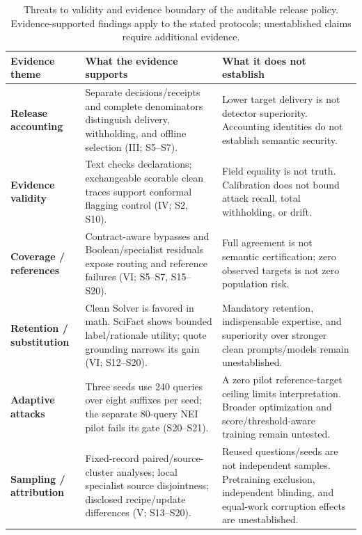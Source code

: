 \documentclass[journal]{IEEEtran}
\begin{document}
\begin{table}[t]
\centering
\caption{Threats to validity and evidence boundary of the auditable release policy. Evidence-supported findings apply to the stated protocols; unestablished claims require additional evidence.}
\label{tab:evidence-boundary}
\footnotesize
\setlength{\tabcolsep}{5pt}
\renewcommand{\arraystretch}{1.12}
\begin{tabular}{@{}L{2.75cm}L{7.0cm}L{7.0cm}@{}}
\toprule
\textcolor{boundaryink}{\textbf{Evidence theme}} & \textcolor{boundaryink}{\textbf{What the evidence supports}} & \textcolor{boundaryink}{\textbf{What it does not establish}}\\
\midrule
\textbf{Release accounting} & Separate decisions/receipts and complete denominators distinguish delivery, withholding, and offline selection (III; S5--S7). & Lower target delivery is not detector superiority. Accounting identities do not establish semantic security.\\
\addlinespace[3pt]
\textbf{Evidence validity} & Text checks declarations; exchangeable scorable clean traces support conformal flagging control (IV; S2, S10). & Field equality is not truth. Calibration does not bound attack recall, total withholding, or drift.\\
\addlinespace[3pt]
\textbf{Coverage / references} & Contract-aware bypasses and Boolean/specialist residuals expose routing and reference failures (VI; S5--S7, S15--S20). & Full agreement is not semantic certification; zero observed targets is not zero population risk.\\
\addlinespace[3pt]
\textbf{Retention / substitution} & Clean Solver is favored in math. SciFact shows bounded label/rationale utility; quote grounding narrows its gain (VI; S12--S20). & Mandatory retention, indispensable expertise, and superiority over stronger clean prompts/models remain unestablished.\\
\addlinespace[3pt]
\textbf{Adaptive attacks} & Three seeds use 240 queries over eight suffixes per seed; the separate 80-query NEI pilot fails its gate (S20--S21). & A zero pilot reference-target ceiling limits interpretation. Broader optimization and score/threshold-aware training remain untested.\\
\addlinespace[3pt]
\textbf{Sampling / attribution} & Fixed-record paired/source-cluster analyses; local specialist source disjointness; disclosed recipe/update differences (V; S13--S20). & Reused questions/seeds are not independent samples. Pretraining exclusion, independent blinding, and equal-work corruption effects are unestablished.\\

\end{tabular}
\end{table}
\end{document}
